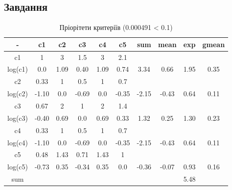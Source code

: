 \subsection{Завдання}
\label{subsec:saaty/task}

\begin{table}[!ht]
    \centering
    \caption{Пріорітети критеріїв (0.000491 < 0.1)}
    \label{tab:criterion_priorities}

    \begin{tabular}{|c||c|c|c|c|c||c|c|c||c|}
        \toprule
        -       & c1    & c2   & c3    & c4   & c5    & sum   & mean  & exp  & gmean \\

        \midrule
        c1      & 1     & 3    & 1.5   & 3    & 2.1   &       &       &      &       \\
        log(c1) & 0.0   & 1.09 & 0.40  & 1.09 & 0.74  & 3.34  & 0.66  & 1.95 & 0.35  \\
        \hline
        c2      & 0.33  & 1    & 0.5   & 1    & 0.7   &       &       &      &       \\
        log(c2) & -1.10 & 0.0  & -0.69 & 0.0  & -0.35 & -2.15 & -0.43 & 0.64 & 0.11  \\
        \hline
        c3      & 0.67  & 2    & 1     & 2    & 1.4   &       &       &      &       \\
        log(c3) & -0.40 & 0.69 & 0.0   & 0.69 & 0.33  & 1.32  & 0.25  & 1.30 & 0.23  \\
        \hline
        c4      & 0.33  & 1    & 0.5   & 1    & 0.7   &       &       &      &       \\
        log(c4) & -1.10 & 0.0  & -0.69 & 0.0  & -0.35 & -2.15 & -0.43 & 0.64 & 0.11  \\
        \hline
        c5      & 0.48  & 1.43 & 0.71  & 1.43 & 1     &       &       &      &       \\
        log(c5) & -0.73 & 0.35 & -0.34 & 0.35 & 0.0   & -0.36 & -0.07 & 0.93 & 0.16  \\

        \bottomrule
        sum     &       &      &       &      &       &       &       & 5.48 &       \\
        \hline
    \end{tabular}
\end{table}

